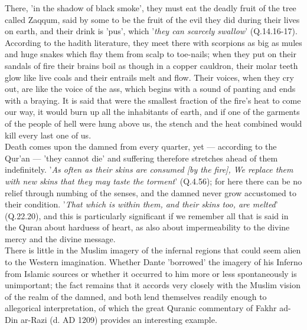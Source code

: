 \documentclass[11pt, b5paper, twoside]{book}
\begin{document}
There, 'in the shadow of black smoke', they must eat the deadly fruit of the tree called Zaqqum, said 
by some to be the fruit of the evil they did during their lives on earth, and their drink is 'pus', 
which '\emph{they can scarcely swallow}' (Q.14.16-17). According to the hadith literature, they meet there 
with scorpions as big as mules and huge snakes which flay them from scalp to toe-nails; when they put 
on their sandals of fire their brains boil as though in a copper cauldron, their molar teeth glow 
like live coals and their entrails melt and flow. Their voices, when they cry out, are like the voice 
of the ass, which begins with a sound of panting and ends with a braying. It is said that were the 
smallest fraction of the fire's heat to come our way, it would burn up all the inhabitants of earth, 
and if one of the garments of the people of hell were hung above us, the stench and the heat combined 
would kill every last one of us. \\

Death comes upon the damned from every quarter, yet --- according to the Qur'an --- 'they cannot die' and 
suffering therefore stretches ahead of them indefinitely. '\emph{As often as their skins are consumed [by 
the fire], We replace them with new skins that they may taste the torment}' (Q.4.56); for here there 
can be no relief through numbing of the senses, and the damned never grow accustomed to their 
condition. '\emph{That which is within them, and their skins too, are melted}' (Q.22.20), and this is 
particularly significant if we remember all that is said in the Quran about harduess of heart, as 
also about impermeability to the divine mercy and the divine message. \\

There is little in the Muslim imagery of the infernal regions that could seem alien to the Western 
imagination. Whether Dante 'borrowed' the imagery of his Inferno from Islamic sources or whether it 
occurred to him more or less spontaneously is unimportant; the fact remains that it accords very 
closely with the Muslim vision of the realm of the damned, and both lend themselves readily enough to 
allegorical interpretation, of which the great Quranic commentary of Fakhr ad-Din ar-Razi (d. AD 
1209) provides an interesting example. \\
\end{document}
